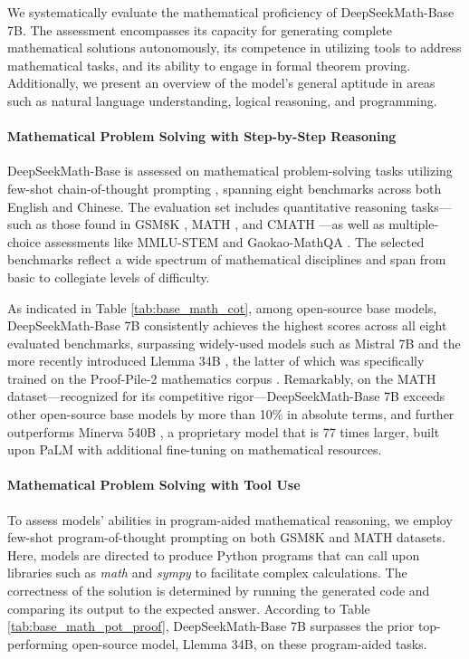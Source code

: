 \begin{itemize}[topsep=0pt]
We systematically evaluate the mathematical proficiency of DeepSeekMath-Base 7B. The assessment encompasses its capacity for generating complete mathematical solutions autonomously, its competence in utilizing tools to address mathematical tasks, and its ability to engage in formal theorem proving. Additionally, we present an overview of the model’s general aptitude in areas such as natural language understanding, logical reasoning, and programming.

\paragraph{Mathematical Problem Solving with Step-by-Step Reasoning}

DeepSeekMath-Base is assessed on mathematical problem-solving tasks utilizing few-shot chain-of-thought prompting \citep{cot}, spanning eight benchmarks across both English and Chinese. The evaluation set includes quantitative reasoning tasks—such as those found in GSM8K \citep{gsm8k}, MATH \citep{MATH}, and CMATH \citep{wei2023cmath}—as well as multiple-choice assessments like MMLU-STEM \citep{mmlu} and Gaokao-MathQA \citep{agieval}. The selected benchmarks reflect a wide spectrum of mathematical disciplines and span from basic to collegiate levels of difficulty.

As indicated in Table \ref{tab:base_math_cot}, among open-source base models, DeepSeekMath-Base 7B consistently achieves the highest scores across all eight evaluated benchmarks, surpassing widely-used models such as Mistral 7B \citep{mistral} and the more recently introduced Llemma 34B \citep{llemma}, the latter of which was specifically trained on the Proof-Pile-2 mathematics corpus \citep{llemma}. Remarkably, on the MATH dataset—recognized for its competitive rigor—DeepSeekMath-Base 7B exceeds other open-source base models by more than 10\% in absolute terms, and further outperforms Minerva 540B \citep{minerva}, a proprietary model that is 77 times larger, built upon PaLM \citep{palm} with additional fine-tuning on mathematical resources.

\paragraph{Mathematical Problem Solving with Tool Use} To assess models’ abilities in program-aided mathematical reasoning, we employ few-shot program-of-thought prompting \citep{pot,pal} on both GSM8K and MATH datasets. Here, models are directed to produce Python programs that can call upon libraries such as \textit{math} and \textit{sympy} to facilitate complex calculations. The correctness of the solution is determined by running the generated code and comparing its output to the expected answer. According to Table \ref{tab:base_math_pot_proof}, DeepSeekMath-Base 7B surpasses the prior top-performing open-source model, Llemma 34B, on these program-aided tasks.


\end{itemize}
